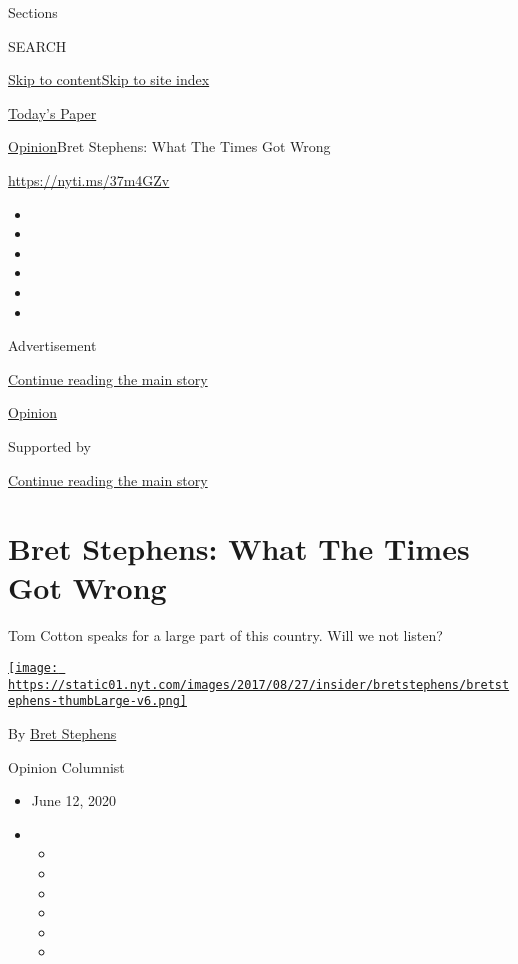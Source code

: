 Sections

SEARCH

\protect\hyperlink{site-content}{Skip to
content}\protect\hyperlink{site-index}{Skip to site index}

\href{https://myaccount.nytimes.com/auth/login?response_type=cookie\&client_id=vi}{}

\href{https://www.nytimes.com/section/todayspaper}{Today's Paper}

\href{/section/opinion}{Opinion}\textbar{}Bret Stephens: What The Times
Got Wrong

\href{https://nyti.ms/37m4GZv}{https://nyti.ms/37m4GZv}

\begin{itemize}
\item
\item
\item
\item
\item
\item
\end{itemize}

Advertisement

\protect\hyperlink{after-top}{Continue reading the main story}

\href{/section/opinion}{Opinion}

Supported by

\protect\hyperlink{after-sponsor}{Continue reading the main story}

\hypertarget{bret-stephens-what-the-times-got-wrong}{%
\section{Bret Stephens: What The Times Got
Wrong}\label{bret-stephens-what-the-times-got-wrong}}

Tom Cotton speaks for a large part of this country. Will we not listen?

\href{https://www.nytimes.com/by/bret-stephens}{\texttt{[image: https://static01.nyt.com/images/2017/08/27/insider/bretstephens/bretstephens-thumbLarge-v6.png]}}

By \href{https://www.nytimes.com/by/bret-stephens}{Bret Stephens}

Opinion Columnist

\begin{itemize}
\item
  June 12, 2020
\item
  \begin{itemize}
  \item
  \item
  \item
  \item
  \item
  \item
  \end{itemize}
\end{itemize}

